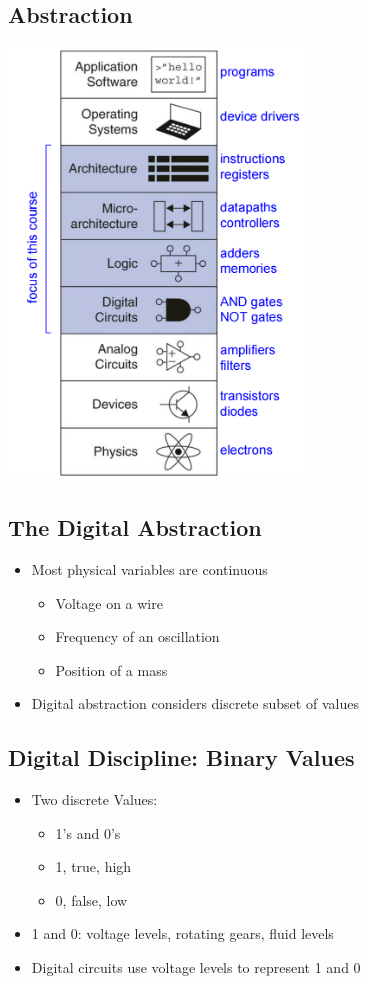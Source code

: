\documentclass[12pt]{article}
\begin{document}
\subsection{Abstraction}
\includegraphics[width=0.6\textwidth]{Abstraction.png}
\subsection{The Digital Abstraction}
\begin{itemize}
    \item Most physical variables are continuous \begin{itemize}
        \item Voltage on a wire
        \item Frequency of an oscillation
        \item Position of a mass
    \end{itemize}
    \item Digital abstraction considers discrete subset of values
\end{itemize}
\subsection{Digital Discipline: Binary Values}
\begin{itemize}
    \item Two discrete Values: \begin{itemize}
        \item 1's and 0's
        \item 1, true, high
        \item 0, false, low
    \end{itemize}
    \item 1 and 0: voltage levels, rotating gears, fluid levels
    \item Digital circuits use voltage levels to represent 1 and 0
\end{itemize}
\end{document}
